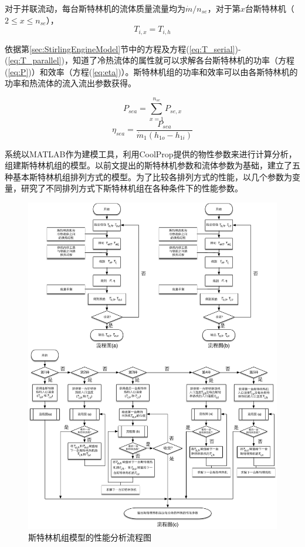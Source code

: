 对于并联流动，每台斯特林机的流体质量流量均为$\dot{m}/n_{se}$，对于第$x$台斯特林机（$2\leqslant{}x\leqslant{}n_{se}$），
\begin{equation}
	T_{i,x} = T_{i,h}
	\label{eq:T_parallel}
\end{equation}

依据第\ref{sec:StirlingEngineModel}节中的方程及方程(\ref{eq:T_serial})-(\ref{eq:T_parallel})，知道了冷热流体的属性就可以求解各台斯特林机的功率（方程(\ref{eq:P})）和效率（方程(\ref{eq:eta})）。斯特林机组的功率和效率可以由各斯特林机的功率和热流体的流入流出参数获得。

\begin{equation}
	P_{sea} = \sum_{x = 1}^{n_{se}}P_{se,x}
\end{equation}
\begin{equation}
	\eta_{sea} = \dfrac{P_{sea}}{\dot{m}_1(h_{1o} - h_{1i})}
\end{equation}

系统以MATLAB作为建模工具，利用CoolProp提供的物性参数来进行计算分析，组建斯特林机组的模型。以前文提出的斯特林机参数和流体参数为基础，建立了五种基本斯特林机组排列方式的模型。为了比较各排列方式的性能，以几个参数为变量，研究了不同排列方式下斯特林机组在各种条件下的性能参数。

\noindent \begin{figure}[htbp]
\begin{center}
	\includegraphics[width = 1.0\columnwidth]{fig/FlowChart}
	\caption{斯特林机组模型的性能分析流程图}
	\label{fig:Flowchart}
\end{center}
\end{figure}

